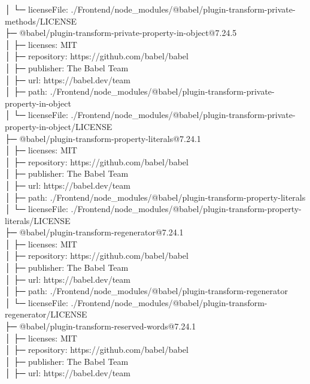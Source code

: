\documentclass[
    paper=a4,
    twoside=false,
    parskip=half,
    listof=entryprefix,
    listof=totoc,
    index=totoc,
    bibliography=totoc,
    headsepline,
]{scrbook}
\begin{document}
    │  └─ licenseFile: ./Frontend/node\_modules/@babel/plugin-transform-private-methods/LICENSE\\
    ├─ @babel/plugin-transform-private-property-in-object@7.24.5\\
    │  ├─ licenses: MIT\\
    │  ├─ repository: https://github.com/babel/babel\\
    │  ├─ publisher: The Babel Team\\
    │  ├─ url: https://babel.dev/team\\
    │  ├─ path: ./Frontend/node\_modules/@babel/plugin-transform-private-property-in-object\\
    │  └─ licenseFile: ./Frontend/node\_modules/@babel/plugin-transform-private-property-in-object/LICENSE\\
    ├─ @babel/plugin-transform-property-literals@7.24.1\\
    │  ├─ licenses: MIT\\
    │  ├─ repository: https://github.com/babel/babel\\
    │  ├─ publisher: The Babel Team\\
    │  ├─ url: https://babel.dev/team\\
    │  ├─ path: ./Frontend/node\_modules/@babel/plugin-transform-property-literals\\
    │  └─ licenseFile: ./Frontend/node\_modules/@babel/plugin-transform-property-literals/LICENSE\\
    ├─ @babel/plugin-transform-regenerator@7.24.1\\
    │  ├─ licenses: MIT\\
    │  ├─ repository: https://github.com/babel/babel\\
    │  ├─ publisher: The Babel Team\\
    │  ├─ url: https://babel.dev/team\\
    │  ├─ path: ./Frontend/node\_modules/@babel/plugin-transform-regenerator\\
    │  └─ licenseFile: ./Frontend/node\_modules/@babel/plugin-transform-regenerator/LICENSE\\
    ├─ @babel/plugin-transform-reserved-words@7.24.1\\
    │  ├─ licenses: MIT\\
    │  ├─ repository: https://github.com/babel/babel\\
    │  ├─ publisher: The Babel Team\\
    │  ├─ url: https://babel.dev/team\\
\end{document}
